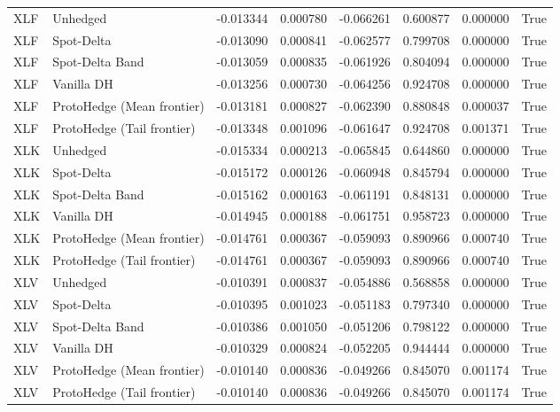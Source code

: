 \begin{tabular}{llrrrrrr}
XLF & Unhedged & -0.013344 & 0.000780 & -0.066261 & 0.600877 & 0.000000 & True \\
XLF & Spot-Delta & -0.013090 & 0.000841 & -0.062577 & 0.799708 & 0.000000 & True \\
XLF & Spot-Delta Band & -0.013059 & 0.000835 & -0.061926 & 0.804094 & 0.000000 & True \\
XLF & Vanilla DH & -0.013256 & 0.000730 & -0.064256 & 0.924708 & 0.000000 & True \\
XLF & ProtoHedge (Mean frontier) & -0.013181 & 0.000827 & -0.062390 & 0.880848 & 0.000037 & True \\
XLF & ProtoHedge (Tail frontier) & -0.013348 & 0.001096 & -0.061647 & 0.924708 & 0.001371 & True \\
XLK & Unhedged & -0.015334 & 0.000213 & -0.065845 & 0.644860 & 0.000000 & True \\
XLK & Spot-Delta & -0.015172 & 0.000126 & -0.060948 & 0.845794 & 0.000000 & True \\
XLK & Spot-Delta Band & -0.015162 & 0.000163 & -0.061191 & 0.848131 & 0.000000 & True \\
XLK & Vanilla DH & -0.014945 & 0.000188 & -0.061751 & 0.958723 & 0.000000 & True \\
XLK & ProtoHedge (Mean frontier) & -0.014761 & 0.000367 & -0.059093 & 0.890966 & 0.000740 & True \\
XLK & ProtoHedge (Tail frontier) & -0.014761 & 0.000367 & -0.059093 & 0.890966 & 0.000740 & True \\
XLV & Unhedged & -0.010391 & 0.000837 & -0.054886 & 0.568858 & 0.000000 & True \\
XLV & Spot-Delta & -0.010395 & 0.001023 & -0.051183 & 0.797340 & 0.000000 & True \\
XLV & Spot-Delta Band & -0.010386 & 0.001050 & -0.051206 & 0.798122 & 0.000000 & True \\
XLV & Vanilla DH & -0.010329 & 0.000824 & -0.052205 & 0.944444 & 0.000000 & True \\
XLV & ProtoHedge (Mean frontier) & -0.010140 & 0.000836 & -0.049266 & 0.845070 & 0.001174 & True \\
XLV & ProtoHedge (Tail frontier) & -0.010140 & 0.000836 & -0.049266 & 0.845070 & 0.001174 & True \\
\bottomrule
\end{tabular}
